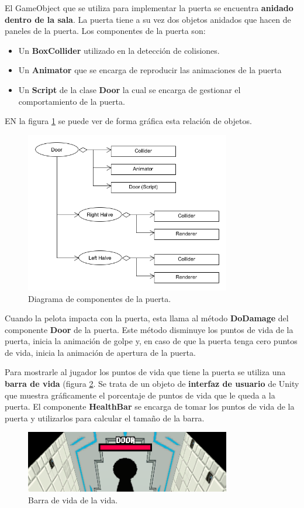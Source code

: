 El GameObject que se utiliza para implementar la puerta se encuentra \textbf{anidado dentro de la sala}. La puerta tiene a su vez dos objetos anidados que hacen de paneles de la puerta. Los componentes de la puerta son:
\begin{itemize}
\item Un \textbf{BoxCollider} utilizado en la detección de colisiones.
\item Un \textbf{Animator} que se encarga de reproducir las animaciones de la puerta
\item Un \textbf{Script} de la clase \textbf{Door} la cual se encarga de gestionar el comportamiento de la puerta.
\end{itemize}
EN la figura \ref{puerta_diagrama} se puede ver de forma gráfica esta relación de objetos.
\begin{figure}[h]
	\includegraphics[width=0.8\textwidth]{images/estructura/fisica/door}
	\centering
	\caption{Diagrama de componentes de la puerta.}
	\label{puerta_diagrama}
\end{figure}

Cuando la pelota impacta con la puerta, esta llama al método \textbf{DoDamage} del componente \textbf{Door} de la puerta. Este método disminuye los puntos de vida de la puerta, inicia la animación de golpe y, en caso de que la puerta tenga cero puntos de vida, inicia la animación de apertura de la puerta. 

Para mostrarle al jugador los puntos de vida que tiene la puerta se utiliza una \textbf{barra de vida} (figura \ref{barra}. Se trata de un objeto de \textbf{interfaz de usuario} de Unity que muestra gráficamente el porcentaje de puntos de vida que le queda a la puerta. El componente \textbf{HealthBar} se encarga de tomar los puntos de vida de la puerta y utilizarlos para calcular el tamaño de la barra. 
\begin{figure}[h]
	\includegraphics[width=0.8\textwidth]{images/estructura/fisica/barra}
	\centering
	\caption{Barra de vida de la vida.}
	\label{barra}
\end{figure}


